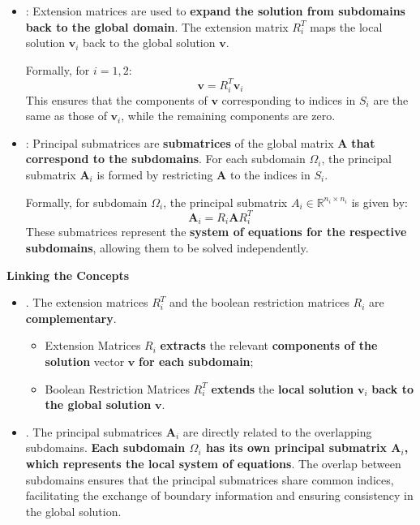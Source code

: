 \begin{itemize}
    \item {}: Extension matrices are used to \textbf{expand the solution from subdomains back to the global domain}. The extension matrix $R_{i}^{T}$ maps the local solution $\mathbf{v}_{i}$ back to the global solution $\mathbf{v}$.

    Formally, for $i = 1, 2$:
    \begin{equation*}
        \mathbf{v} = R_{i}^{T} \mathbf{v}_{i}
    \end{equation*}
    This ensures that the components of $\mathbf{v}$ corresponding to indices in $S_{i}$ are the same as those of $\mathbf{v}_{i}$, while the remaining components are zero.


    \item {}: Principal submatrices are \textbf{submatrices} of the global matrix $\mathbf{A}$ \textbf{that correspond to the subdomains}. For each subdomain $\Omega_{i}$, the principal submatrix $\mathbf{A}_{i}$ is formed by restricting $\mathbf{A}$ to the indices in $S_{i}$.

    Formally, for subdomain $\Omega_{i}$, the principal submatrix $A_{i} \in \mathbb{R}^{n_{i} \times n_{i}}$ is given by:
    \begin{equation}\label{eq: principal submatrices - discretized schwarz methods}
        \mathbf{A}_{i} = R_{i} \mathbf{A} R_{i}^{T}
    \end{equation}
    These submatrices represent the \textbf{system of equations for the respective subdomains}, allowing them to be solved independently.
\end{itemize}

\begin{flushleft}
    \textcolor{Green3}{ \textbf{Linking the Concepts}}
\end{flushleft}
\begin{itemize}
    \item {}. The extension matrices $R_i^T$ and the boolean restriction matrices $R_i$ are \textbf{complementary}.
    \begin{itemize}
    	\item Extension Matrices $R_{i}$ \textbf{extracts} the relevant \textbf{components of the solution} vector $\mathbf{v}$ \textbf{for each subdomain};
    	\item Boolean Restriction Matrices $R_{i}^{T}$ \textbf{extends} the \textbf{local solution} $\mathbf{v}_{i}$ \textbf{back to the global solution} $\mathbf{v}$.
    \end{itemize}

    \item {}. The principal submatrices $\mathbf{A}_{i}$ are directly related to the overlapping subdomains. \textbf{Each subdomain $\Omega_{i}$ has its own principal submatrix $\mathbf{A}_{i}$, which represents the local system of equations}. The overlap between subdomains ensures that the principal submatrices share common indices, facilitating the exchange of boundary information and ensuring consistency in the global solution.
\end{itemize}

